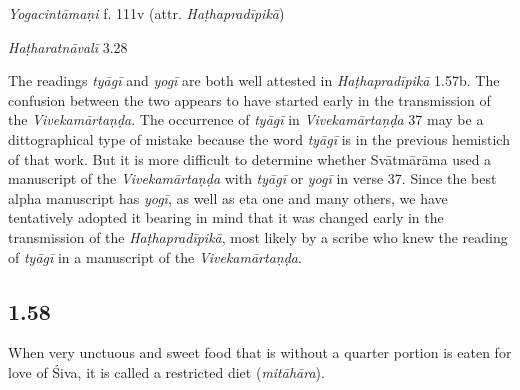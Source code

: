 \begin{ekdosis}
\begin{sources}[hp01_057]
\end{sources}

\begin{testimonia}[hp01_057]
\emph{Yogacintāmaṇi} f. 111v (attr. \emph{Haṭhapradīpikā})

\begin{versinnote}
\end{versinnote}

\emph{Haṭharatnāvalī}  3.28

\begin{versinnote}
\tl{\var{tyāgī ] yogī P,T,t1}\\!}
\end{versinnote}

\end{testimonia}

\begin{philcomm}[hp01_057]
The readings \emph{tyāgī} and \emph{yogī} are both well attested in \emph{Haṭhapradīpikā} 1.57b. The confusion between the two appears to have started early in the transmission of the \emph{Vivekamārtaṇḍa}. The occurrence of \emph{tyāgī} in \emph{Vivekamārtaṇḍa} 37 may be a dittographical type of mistake because the word \emph{tyāgī} is in the previous hemistich of that work. But it is more difficult to determine whether Svātmārāma used a manuscript of the \emph{Vivekamārtaṇḍa} with \emph{tyāgī} or \emph{yogī} in verse 37. Since the best alpha manuscript has \emph{yogī}, as well as eta one and many others, we have tentatively adopted it bearing in mind that it was changed early in the transmission of the \emph{Haṭhapradīpikā}, most likely by a scribe who knew the reading of \emph{tyāgī} in a manuscript of the \emph{Vivekamārtaṇḍa}. 
\end{philcomm}

\subsection*{1.58}
\begin{translation}[hp01_058]
When very unctuous and sweet food that is without a quarter portion is eaten for love of Śiva, it is called a restricted diet (\emph{mitāhāra}).
\end{translation}


\end{ekdosis}
